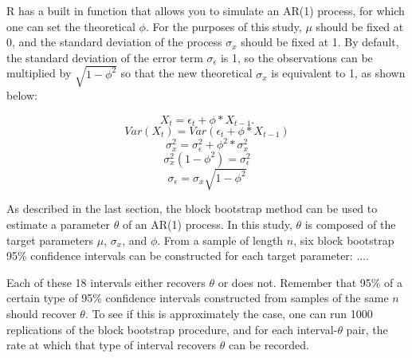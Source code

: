 \documentclass[12pt, letterpaper, titlepage]{article}
\begin{document}

R has a built in function that allows you to simulate an AR(1) process, for which one can set the theoretical $\phi$. For the purposes of this study, $\mu$ should be fixed at 0, and the standard deviation of the process $\sigma_{x}$ should be fixed at 1. By default, the standard deviation of the error term $\sigma_{\epsilon}$ is 1, so the observations can be multiplied by $\sqrt{1 - \phi^2}$ so that the new theoretical $\sigma_{x}$ is equivalent to 1, as shown below:

\[X_{t} = \epsilon_{t} + \phi*X_{t-1}.\]
\[Var(X_{t}) = Var(\epsilon_{t} + \phi*X_{t-1})\]
\[\sigma^2_{x} = \sigma^2_{\epsilon} + \phi^2*\sigma^2_{x}\]
\[\sigma^2_{x}(1 - \phi^2) = \sigma^2_{\epsilon}\]
\[\sigma_{\epsilon} = \sigma_{x}\sqrt{1 - \phi^2}\]

As described in the last section, the block bootstrap method can be used to estimate a parameter $\theta$ of an AR(1) process. In this study, $\theta$ is composed of the target parameters $\mu$, $\sigma_{x}$, and $\phi$. From a sample of length $n$, six block bootstrap 95\% confidence intervals can be constructed for each target parameter: ....

Each of these 18 intervals either recovers $\theta$ or does not. Remember that 95\% of a certain type of 95\% confidence intervals constructed from samples of the same $n$ should recover $\theta$. To see if this is approximately the case, one can run 1000 replications of the block bootstrap procedure, and for each interval-$\theta$ pair, the rate at which that type of interval recovers $\theta$ can be recorded.
\end{document}
